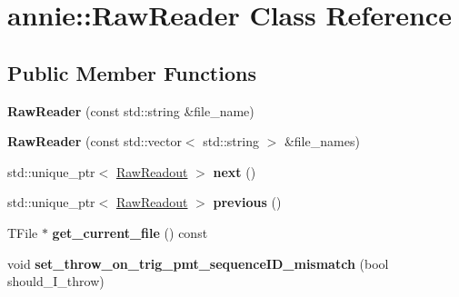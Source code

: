 \hypertarget{classannie_1_1RawReader}{
\section{annie::RawReader Class Reference}
\label{classannie_1_1RawReader}
}
\subsection*{Public Member Functions}
\begin{DoxyCompactItemize}
\item 
\hypertarget{classannie_1_1RawReader_a3d26acd104f49e1ffde15a13d068c1e1}{
{\bfseries RawReader} (const std::string \&file\_\-name)}
\label{classannie_1_1RawReader_a3d26acd104f49e1ffde15a13d068c1e1}

\item 
\hypertarget{classannie_1_1RawReader_a56a7889e6662ce98990465942858d10a}{
{\bfseries RawReader} (const std::vector$<$ std::string $>$ \&file\_\-names)}
\label{classannie_1_1RawReader_a56a7889e6662ce98990465942858d10a}

\item 
\hypertarget{classannie_1_1RawReader_aabcb9bd9bd3a456524dda84f7ffacd26}{
std::unique\_\-ptr$<$ \hyperlink{classannie_1_1RawReadout}{RawReadout} $>$ {\bfseries next} ()}
\label{classannie_1_1RawReader_aabcb9bd9bd3a456524dda84f7ffacd26}

\item 
\hypertarget{classannie_1_1RawReader_ae161fd248f9d5bc60d354b779b4760b8}{
std::unique\_\-ptr$<$ \hyperlink{classannie_1_1RawReadout}{RawReadout} $>$ {\bfseries previous} ()}
\label{classannie_1_1RawReader_ae161fd248f9d5bc60d354b779b4760b8}

\item 
\hypertarget{classannie_1_1RawReader_a42f6db4cb672b510e20fdbb7270ce009}{
TFile $\ast$ {\bfseries get\_\-current\_\-file} () const }
\label{classannie_1_1RawReader_a42f6db4cb672b510e20fdbb7270ce009}

\item 
\hypertarget{classannie_1_1RawReader_aeaeb8f323990ff57667f96305426b039}{
void {\bfseries set\_\-throw\_\-on\_\-trig\_\-pmt\_\-sequenceID\_\-mismatch} (bool should\_\-I\_\-throw)}
\label{classannie_1_1RawReader_aeaeb8f323990ff57667f96305426b039}

\end{DoxyCompactItemize}
